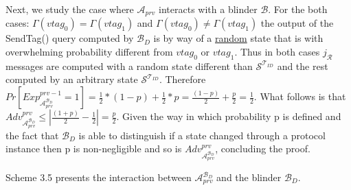     Next, we study the case where $\mathcal{A}_{prv}$ interacts with a blinder $\mathcal{B}$. For the both cases: $\Gamma(vtag_0) = \Gamma(vtag_1)$ and 
    $\Gamma(vtag_0) \neq \Gamma(vtag_1)$ the output of the SendTag() query computed by $\mathcal{B}_D$ is by way of a \underline{random} state that is
    with overwhelming probability different from $vtag_0$ or $vtag_1$. Thus in both cases $j_\mathcal{R}$ messages are computed with a random 
    state different than $\mathcal{S}^{\mathcal{T}_{ID}}$ and the rest computed by an arbitrary state $\mathcal{S}^{\mathcal{T}_{ID}}$. Therefore 
    $Pr[Exp_{\mathcal{A}_{prv}^{\mathcal{B}_D}}^{prv-1} = 1] = \frac{1}{2}*(1-p)+\frac{1}{2}*p = \frac{(1-p)}{2}+\frac{p}{2} = \frac{1}{2}.$
    What follows is that $Adv_{\mathcal{A}_{prv}^{\mathcal{B}_D}}^{prv} \leq | \frac{(1+p)}{2} - \frac{1}{2} | = \frac{p}{2}$. Given the way in 
    which probability p is defined and the fact that $\mathcal{B}_D$ is able to distinguish if a state changed through a protocol instance then
    p is non-negligible and so is $Adv_{\mathcal{A}_{prv}^{\mathcal{B}_D}}^{prv}$, concluding the proof. 

    Scheme 3.5 presents the interaction between $\mathcal{A}_{prv}^{\mathcal{B}_D}$ and the blinder $\mathcal{B}_D$.

